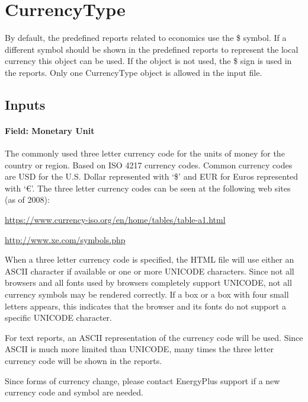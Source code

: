 \section{CurrencyType}\label{currencytype}
By default, the predefined reports related to economics use the \$ symbol. If a different symbol should be shown in the predefined reports to represent the local currency this object can be used. If the object is not used, the \$ sign is used in the reports. Only one CurrencyType object is allowed in the input file.

\subsection{Inputs}\label{inputs-061}

\paragraph{Field: Monetary Unit}\label{field-monetary-unit}

The commonly used three letter currency code for the units of money for the country or region. Based on ISO 4217 currency codes. Common currency codes are USD for the U.S. Dollar represented with `\$' and EUR for Euros represented with `€'. The three letter currency codes can be seen at the following web sites (as of 2008):

\url{https://www.currency-iso.org/en/home/tables/table-a1.html}

\url{http://www.xe.com/symbols.php}

When a three letter currency code is specified, the HTML file will use either an ASCII character if available or one or more UNICODE characters. Since not all browsers and all fonts used by browsers completely support UNICODE, not all currency symbols may be rendered correctly. If a box or a box with four small letters appears, this indicates that the browser and its fonts do not support a specific UNICODE character.

For text reports, an ASCII representation of the currency code will be used. Since ASCII is much more limited than UNICODE, many times the three letter currency code will be shown in the reports.

Since forms of currency change, please contact EnergyPlus support if a new currency code and symbol are needed.

